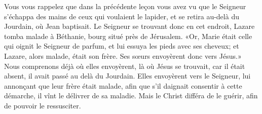Vous vous rappelez que dans la précédente leçon
	vous avez vu que le Seigneur
		s’échappa des mains de ceux qui voulaient le lapider,
	et se retira au-delà du Jourdain, où Jean baptisait.
Le Seigneur se trouvant donc en cet endroit,
	Lazare tomba malade à Béthanie,
	bourg situé près de Jérusalem.
«Or, Marie était celle qui oignit le Seigneur de parfum,
	et lui essuya les pieds avec ses cheveux;
	et Lazare, alors malade, était son frère.
	Ses sœurs envoyèrent donc vers Jésus.»
Nous comprenons déjà où elles envoyèrent, là où Jésus se trouvait,
	car il était absent, il avait passé au delà du Jourdain.
Elles envoyèrent vers le Seigneur, lui annonçant que leur frère était malade,
	afin que s’il daignait consentir à cette démarche,
	il vînt le délivrer de sa maladie.
Mais le Christ différa de le guérir, afin de pouvoir le ressusciter.
